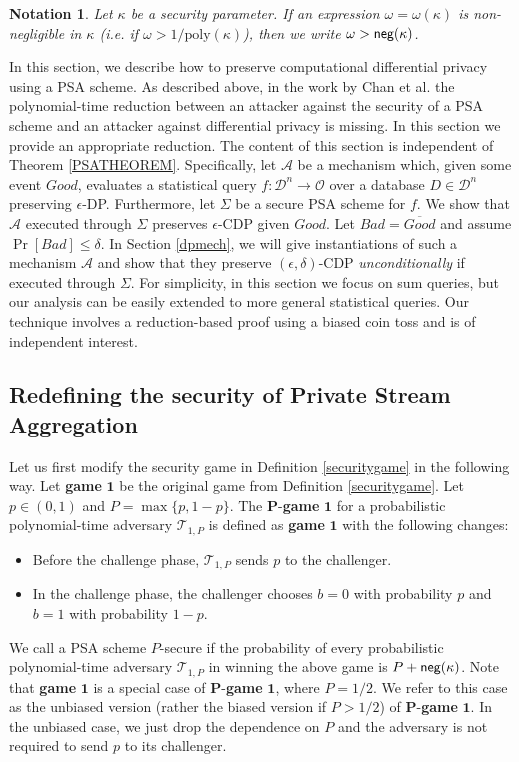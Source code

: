 \documentclass[10pt]{extarticle}
\newtheorem{Ntn}{Notation}
\begin{document}
\begin{Ntn} Let $\kappa$ be a security parameter. If an expression $\omega=\omega(\kappa)$ is non-negligible in $\kappa$ (i.e. if $\omega> 1/\text{poly}(\kappa)$), then we write $\omega>\text{\upshape\sffamily neg}(\kappa)$.
\end{Ntn}

In this section, we describe how to preserve computational differential privacy using a PSA scheme. As described above, in the work by Chan et al. \cite{3} the polynomial-time reduction between an attacker against the security of a PSA scheme and an attacker against differential privacy is missing. In this section we provide an appropriate reduction. The content of this section is independent of Theorem \ref{PSATHEOREM}. Specifically, let $\mathcal{A}$ be a mechanism which, given some event $Good$, evaluates a statistical query $f:\mathcal{D}^n\to\mathcal{O}$ over a database $D\in\mathcal{D}^n$ preserving $\epsilon$-\mbox{\upshape\sffamily DP}. Furthermore, let $\Sigma$ be a secure PSA scheme for $f$. We show that $\mathcal{A}$ executed through $\Sigma$ preserves $\epsilon$-\mbox{\upshape\sffamily CDP} given $Good$. Let $Bad=\overline{Good}$ and assume $\Pr[Bad]\leq\delta$. In Section \ref{dpmech}, we will give instantiations of such a mechanism $\mathcal{A}$ and show that they preserve $(\epsilon,\delta)$-\mbox{\upshape\sffamily CDP} \textit{unconditionally} if executed through $\Sigma$. For simplicity, in this section we focus on sum queries, but our analysis can be easily extended to more general statistical queries. Our technique involves a reduction-based proof using a biased coin toss and is of independent interest.

\subsection{Redefining the security of Private Stream Aggregation}
Let us first modify the security game in Definition \ref{securitygame} in the following way. Let \textbf{game} $\boldsymbol 1$ be the original game from Definition \ref{securitygame}. Let $p\in(0,1)$ and $P=\max\{p,1-p\}$. The $\boldsymbol P$-\textbf{game} $\boldsymbol 1$ for a probabilistic polynomial-time adversary $\mathcal{T}_{1,P}$ is defined as \textbf{game} $\boldsymbol 1$ with the following changes:
\begin{itemize}
 \item Before the challenge phase, $\mathcal{T}_{1,P}$ sends $p$ to the challenger.
 \item In the challenge phase, the challenger chooses $b=0$ with probability $p$ and $b=1$ with probability $1-p$.
\end{itemize}
We call a PSA scheme $P$-secure if the probability of every probabilistic polynomial-time adversary $\mathcal{T}_{1,P}$ in winning the above game is $P+\mbox{\upshape\sffamily neg}(\kappa)$. Note that \textbf{game} $\boldsymbol 1$ is a special case of $\boldsymbol P$-\textbf{game} $\boldsymbol 1$, where $P=1/2$. We refer to this case as the unbiased version (rather the biased version if $P>1/2$) of $\boldsymbol P$-\textbf{game} $\boldsymbol 1$. In the unbiased case, we just drop the dependence on $P$ and the adversary is not required to send $p$ to its challenger.
\end{document}
